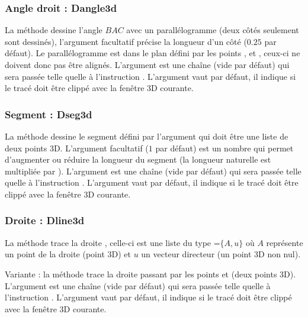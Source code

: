 \subsubsection{Angle droit : Dangle3d}

La méthode  dessine l'angle \(BAC\) avec un parallélogramme (deux côtés seulement sont dessinés), l'argument facultatif  précise la longueur d'un côté ($0.25$ par défaut). Le parallélogramme est dans le plan défini par les points ,  et , ceux-ci ne doivent donc pas être alignés. L'argument  est une chaîne (vide par défaut) qui sera passée telle quelle à l'instruction  \drawcmd . L'argument  vaut \false par défaut, il indique si le tracé doit être clippé avec la fenêtre 3D courante.
    
\subsubsection{Segment : Dseg3d}

La méthode  dessine le segment défini par l'argument  qui doit être une liste de deux points 3D. L'argument facultatif  ($1$ par défaut) est un nombre qui permet d'augmenter ou réduire la longueur du segment (la longueur naturelle est multipliée par ). L'argument  est une chaîne (vide par défaut) qui sera passée telle quelle à l'instruction \drawcmd . L'argument  vaut \false par défaut, il indique si le tracé doit être clippé avec la fenêtre 3D courante.
    
\subsubsection{Droite : Dline3d}

La méthode  trace la droite , celle-ci est une liste du type =$\{A,u\}$ où $A$ représente un point de la droite (point 3D) et $u$ un vecteur directeur (un point 3D non nul). 

Variante : la méthode  trace la droite passant par les points  et  (deux points 3D). L'argument  est une chaîne (vide par défaut) qui sera passée telle quelle à l'instruction \drawcmd . L'argument  vaut \false par défaut, il indique si le tracé doit être clippé avec la fenêtre 3D courante.


